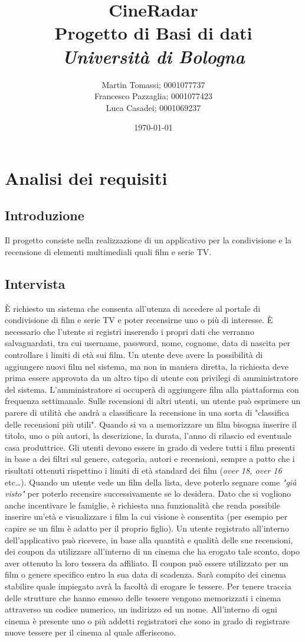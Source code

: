 \documentclass[a4paper,12pt]{report}
\title{\textbf{CineRadar}\\Progetto di Basi di dati\\\textit{Università di Bologna}}
\author{Martin Tomassi; 0001077737\\Francesco Pazzaglia; 0001077423\\Luca Casadei; 0001069237}
\date{\today}
\begin{document}
	\maketitle
	\tableofcontents
	\chapter{Analisi dei requisiti}
	\section{Introduzione}
	Il progetto consiste nella realizzazione di un applicativo per la condivisione e la recensione di elementi multimediali quali film e serie TV.
	\section{Intervista}
	È richiesto un sistema che consenta all'utenza di accedere al portale di condivisione di film e serie TV e poter recensirne uno o più di interesse. È necessario che l'utente si registri inserendo i propri dati che verranno salvaguardati, tra cui username, password, nome, cognome, data di nascita per controllare i limiti di età sui film. Un utente deve avere la possibilità di aggiungere nuovi film nel sistema, ma non in maniera diretta, la richiesta deve prima essere approvata da un altro tipo di utente con privilegi di amministratore del sistema. L'amministratore si occuperà di aggiungere film alla piattaforma con frequenza settimanale. Sulle recensioni di altri utenti, un utente può esprimere un parere di utilità che andrà a classificare la recensione in una sorta di "classifica delle recensioni più utili". Quando si va a memorizzare un film bisogna inserire il titolo, uno o più autori, la descrizione, la durata, l'anno di rilascio ed eventuale casa produttrice. Gli utenti devono essere in grado di vedere tutti i film presenti in base a dei filtri sul genere, categoria, autori e recensioni, sempre a patto che i risultati ottenuti rispettino i limiti di età standard dei film (\textit{over 18, over 16} etc\dots). Quando un utente vede un film della lista, deve poterlo segnare come \textit{"già visto"} per poterlo recensire successivamente se lo desidera. Dato che si vogliono anche incentivare le famiglie, è richiesta una funzionalità che renda possibile inserire un'età e visualizzare i film la cui visione è consentita (per esempio per capire se un film è adatto per il proprio figlio). Un utente registrato all'interno dell'applicativo può ricevere, in base alla quantità e qualità delle sue recensioni, dei coupon da utilizzare all'interno di un cinema che ha erogato tale sconto, dopo aver ottenuto la loro tessera da affiliato. Il coupon può essere utilizzato per un film o genere specifico entro la sua data di scadenza. Sarà compito dei cinema stabilire quale impiegato avrà la facoltà di erogare le tessere. Per tenere traccia delle strutture che hanno emesso delle tessere vengono memorizzati i cinema attraverso un codice numerico, un indirizzo ed un nome. All'interno di ogni cinema è presente uno o più addetti registratori che sono in grado di registrare nuove tessere per il cinema al quale afferiscono.
\end{document}
